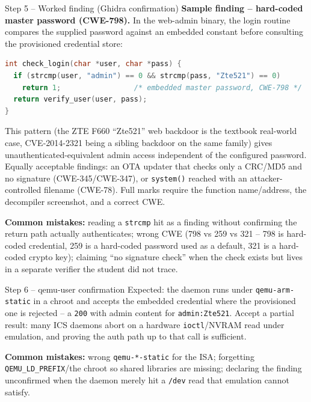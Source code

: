 \documentclass[11pt,a4paper]{article}
\begin{document}
\begin{solutionbox}{Step 5 -- Worked finding (Ghidra confirmation)}
\textbf{Sample finding -- hard-coded master password (CWE-798).} In
the web-admin binary, the login routine compares the supplied password
against an embedded constant before consulting the provisioned
credential store:

\begin{lstlisting}[language=C]
int check_login(char *user, char *pass) {
  if (strcmp(user, "admin") == 0 && strcmp(pass, "Zte521") == 0)
    return 1;                 /* embedded master password, CWE-798 */
  return verify_user(user, pass);
}
\end{lstlisting}

This pattern (the ZTE F660 ``Zte521'' web backdoor is the textbook
real-world case, CVE-2014-2321 being a sibling backdoor on the same
family) gives unauthenticated-equivalent admin access independent of
the configured password. Equally acceptable findings: an OTA updater
that checks only a CRC/MD5 and no signature (CWE-345/CWE-347), or
\texttt{system()} reached with an attacker-controlled filename
(CWE-78). Full marks require the function name/address, the decompiler
screenshot, and a correct CWE.

\textbf{Common mistakes:} reading a \texttt{strcmp} hit as a finding
without confirming the return path actually authenticates; wrong CWE
(798 vs 259 vs 321 -- 798 is hard-coded credential, 259 is a hard-coded
password used as a default, 321 is a hard-coded crypto key); claiming
``no signature check'' when the check exists but lives in a separate
verifier the student did not trace.
\end{solutionbox}

\begin{solutionbox}{Step 6 -- qemu-user confirmation}
Expected: the daemon runs under \texttt{qemu-arm-static} in a chroot
and accepts the embedded credential where the provisioned one is
rejected -- a \texttt{200} with admin content for \texttt{admin:Zte521}.
Accept a partial result: many ICS daemons abort on a hardware
\texttt{ioctl}/NVRAM read under emulation, and proving the auth path up
to that call is sufficient.

\textbf{Common mistakes:} wrong \texttt{qemu-*-static} for the ISA;
forgetting \texttt{QEMU\_LD\_PREFIX}/the chroot so shared libraries are
missing; declaring the finding unconfirmed when the daemon merely hit a
\texttt{/dev} read that emulation cannot satisfy.
\end{solutionbox}
\end{document}
